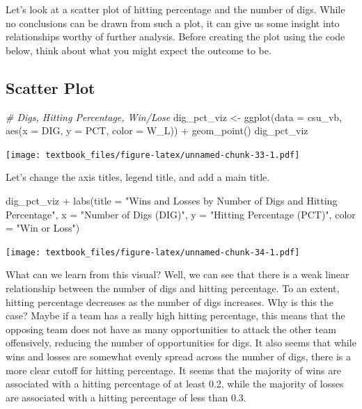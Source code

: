 \documentclass[
  11pt,
]{book}
\newenvironment{Shaded}{\begin{snugshade}}{\end{snugshade}}
\newcommand{\AttributeTok}[1]{\textcolor[rgb]{0.77,0.63,0.00}{#1}}
\newcommand{\CommentTok}[1]{\textcolor[rgb]{0.56,0.35,0.01}{\textit{#1}}}
\newcommand{\FunctionTok}[1]{\textcolor[rgb]{0.00,0.00,0.00}{#1}}
\newcommand{\NormalTok}[1]{#1}
\newcommand{\OtherTok}[1]{\textcolor[rgb]{0.56,0.35,0.01}{#1}}
\newcommand{\SpecialCharTok}[1]{\textcolor[rgb]{0.00,0.00,0.00}{#1}}
\newcommand{\StringTok}[1]{\textcolor[rgb]{0.31,0.60,0.02}{#1}}
\theoremstyle{definition}
\theoremstyle{definition}
\theoremstyle{definition}
\theoremstyle{definition}
\theoremstyle{remark}
\begin{document}
Let's look at a scatter plot of hitting percentage and the number of digs. While no conclusions can be drawn from such a plot, it can give us some insight into relationships worthy of further analysis. Before creating the plot using the code below, think about what you might expect the outcome to be.

\newpage

\hypertarget{scatter-plot}{%
\subsection{Scatter Plot}\label{scatter-plot}}

\begin{Shaded}
\begin{Highlighting}[]
\CommentTok{\# Digs, Hitting Percentage, Win/Lose}
\NormalTok{dig\_pct\_viz }\OtherTok{\textless{}{-}} \FunctionTok{ggplot}\NormalTok{(}\AttributeTok{data =}\NormalTok{ csu\_vb, }\FunctionTok{aes}\NormalTok{(}\AttributeTok{x =}\NormalTok{ DIG, }\AttributeTok{y =}\NormalTok{ PCT, }\AttributeTok{color =}\NormalTok{ W\_L)) }\SpecialCharTok{+}
  \FunctionTok{geom\_point}\NormalTok{()}
\NormalTok{dig\_pct\_viz}
\end{Highlighting}
\end{Shaded}

\texttt{[image: textbook\_files/figure-latex/unnamed-chunk-33-1.pdf]}
\newpage

Let's change the axis titles, legend title, and add a main title.

\begin{Shaded}
\begin{Highlighting}[]
\NormalTok{dig\_pct\_viz }\SpecialCharTok{+}
  \FunctionTok{labs}\NormalTok{(}\AttributeTok{title =} \StringTok{"Wins and Losses by Number of Digs and Hitting Percentage"}\NormalTok{,}
       \AttributeTok{x =} \StringTok{"Number of Digs (DIG)"}\NormalTok{, }\AttributeTok{y =} \StringTok{"Hitting Percentage (PCT)"}\NormalTok{,}
       \AttributeTok{color =} \StringTok{"Win or Loss"}\NormalTok{)}
\end{Highlighting}
\end{Shaded}

\texttt{[image: textbook\_files/figure-latex/unnamed-chunk-34-1.pdf]}

What can we learn from this visual? Well, we can see that there is a weak linear relationship between the number of digs and hitting percentage. To an extent, hitting percentage decreases as the number of digs increases. Why is this the case? Maybe if a team has a really high hitting percentage, this means that the opposing team does not have as many opportunities to attack the other team offensively, reducing the number of opportunities for digs. It also seems that while wins and losses are somewhat evenly spread across the number of digs, there is a more clear cutoff for hitting percentage. It seems that the majority of wins are associated with a hitting percentage of at least 0.2, while the majority of losses are associated with a hitting percentage of less than 0.3.
\end{document}

